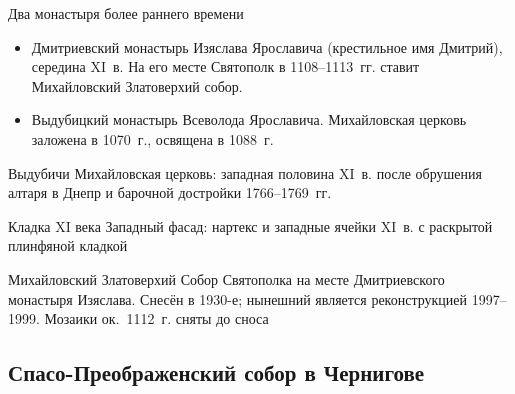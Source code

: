 \begin{frame}{Два монастыря более раннего времени}
  \begin{itemize}
    \item Дмитриевский монастырь Изяслава Ярославича
          (крестильное имя Дмитрий), середина XI~в.
          На его месте Святополк в 1108--1113~гг. ставит
          Михайловский Златоверхий собор.
    \item Выдубицкий монастырь Всеволода Ярославича.
          Михайловская церковь заложена в 1070~г.,
          освящена в 1088~г.
  \end{itemize}
\end{frame}

\begin{frame}{Выдубичи}
    {Михайловская церковь: западная половина XI~в.
     после обрушения алтаря в Днепр и барочной достройки
     1766--1769~гг.}
\end{frame}

\begin{frame}{Кладка XI века}
    {Западный фасад: нартекс и западные ячейки XI~в.
     с раскрытой плинфяной кладкой}
\end{frame}

\begin{frame}{Михайловский Златоверхий}
    {Собор Святополка на месте Дмитриевского монастыря Изяслава.
     Снесён в 1930-е; нынешний является реконструкцией 1997--1999.
     Мозаики ок.\ 1112~г. сняты до сноса}
\end{frame}

\subsection{Спасо-Преображенский собор в Чернигове}

